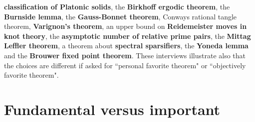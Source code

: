 \documentclass[12pt]{amsart}
\begin{document}
{\bf classification of Platonic solids}, the {\bf Birkhoff ergodic theorem}, the {\bf Burnside lemma}, 
the {\bf Gauss-Bonnet theorem}, Conways rational tangle theorem, 
{\bf Varignon's theorem}, an upper bound on {\bf Reidemeister moves in knot theory}, the 
{\bf asymptotic number of relative prime pairs}, the {\bf Mittag Leffler theorem}, 
a theorem about {\bf spectral sparsifiers}, the {\bf Yoneda lemma} and the {\bf Brouwer fixed point theorem}.
These interviews illustrate also that the choices are different if asked for ``personal favorite theorem"
or ``objectively favorite theorem".  \\

\section*{Fundamental versus important} 
\end{document}
